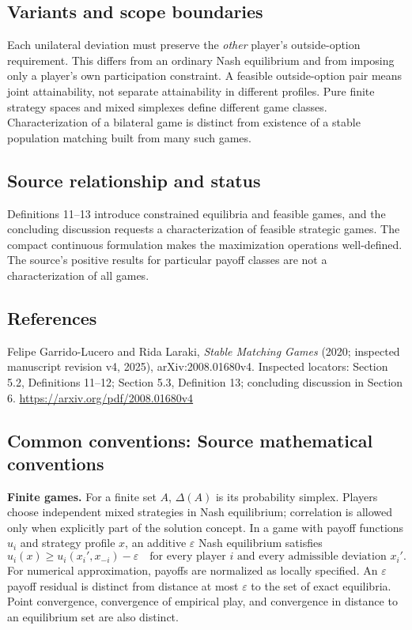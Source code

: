 \documentclass[11pt,a4paper]{article}
\begin{document}
\subsection*{Variants and scope boundaries}
Each unilateral deviation must preserve the \emph{other} player's outside-option requirement. This differs from an ordinary Nash equilibrium and from imposing only a player's own participation constraint. A feasible outside-option pair means joint attainability, not separate attainability in different profiles. Pure finite strategy spaces and mixed simplexes define different game classes. Characterization of a bilateral game is distinct from existence of a stable population matching built from many such games.

\subsection*{Source relationship and status}
Definitions 11--13 introduce constrained equilibria and feasible games, and the concluding discussion requests a characterization of feasible strategic games. The compact continuous formulation makes the maximization operations well-defined. The source's positive results for particular payoff classes are not a characterization of all games.

\subsection*{References}
\begingroup\footnotesize\raggedright
\noindent [S1] Felipe Garrido-Lucero and Rida Laraki, \emph{Stable Matching Games} (2020; inspected manuscript revision v4, 2025), arXiv:2008.01680v4. Inspected locators: Section 5.2, Definitions 11--12; Section 5.3, Definition 13; concluding discussion in Section 6.
\url{https://arxiv.org/pdf/2008.01680v4}
\par\endgroup

\subsection*{Common conventions: Source mathematical conventions}

\textbf{Finite games.} For a finite set $A$, $\Delta(A)$ is its probability
simplex. Players choose independent mixed strategies in Nash equilibrium;
correlation is allowed only when explicitly part of the solution concept.
In a game with payoff functions $u_i$ and strategy profile $x$, an additive
$\varepsilon$ Nash equilibrium satisfies
\[
 u_i(x)\geq u_i(x_i',x_{-i})-\varepsilon
 \quad\text{for every player $i$ and every admissible deviation $x_i'$}.
\]
For numerical approximation, payoffs are normalized as locally specified.
An $\varepsilon$ payoff residual is distinct from distance at most
$\varepsilon$ to the set of exact equilibria. Point convergence, convergence
of empirical play, and convergence in distance to an equilibrium set are
also distinct.
\end{document}
